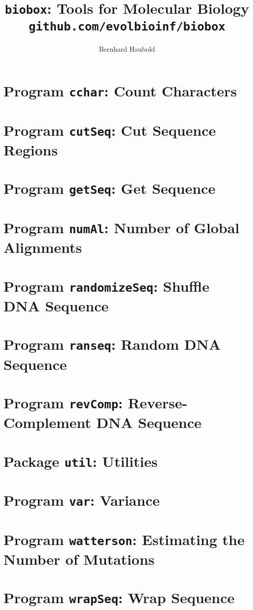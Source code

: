 \documentclass[a4paper]{report}
\begin{document}
\pagestyle{noweb}

\title{\texttt{biobox}: Tools for Molecular Biology\\
\small\texttt{github.com/evolbioinf/biobox}}
\author{Bernhard Haubold}
\maketitle
\tableofcontents

\chapter{Program \texttt{cchar}: Count Characters}\label{ch:cch}

\chapter{Program \texttt{cutSeq}: Cut Sequence Regions}\label{ch:cut}

\chapter{Program \texttt{getSeq}: Get Sequence}\label{ch:get}

\chapter{Program \texttt{numAl}: Number of Global Alignments}\label{ch:num}

\chapter{Program \texttt{randomizeSeq}: Shuffle DNA
  Sequence}\label{ch:rs}

\chapter{Program \texttt{ranseq}: Random DNA Sequence}\label{ch:ran}

\chapter{Program \texttt{revComp}: Reverse-Complement DNA
  Sequence}\label{ch:rev}

\chapter{Package \texttt{util}: Utilities}\label{ch:uti}

\chapter{Program \texttt{var}: Variance}\label{ch:var}

\chapter{Program \texttt{watterson}: Estimating the Number of Mutations}\label{ch:wat}

\chapter{Program \texttt{wrapSeq}: Wrap Sequence}\label{ch:wra}



\end{document}
